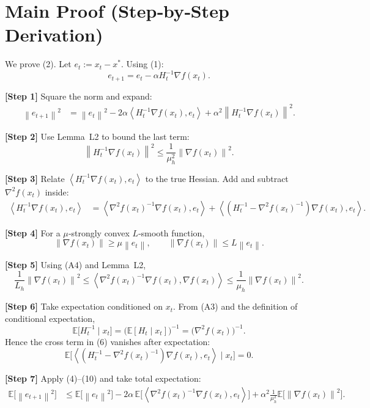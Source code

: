 \documentclass{article}
\newcommand{\E}{\mathbb{E}}
\newcommand{\norm}[1]{\left\|#1\right\|}
\newcommand{\ip}[2]{\left\langle #1,#2\right\rangle}
\begin{document}
\section*{Main Proof (Step‑by‑Step Derivation)}
We prove (2). Let $e_{t}:=x_{t}-x^{*}$. Using (1):
\[
e_{t+1}=e_{t}-\alpha H_{t}^{-1}\nabla f(x_{t}).
\tag{3}
\]

\noindent\textbf{[Step 1]} Square the norm and expand:
\[
\begin{aligned}
\norm{e_{t+1}}^{2}
&=\norm{e_{t}}^{2}
-2\alpha\ip{H_{t}^{-1}\nabla f(x_{t})}{e_{t}}
+\alpha^{2}\norm{H_{t}^{-1}\nabla f(x_{t})}^{2}.
\end{aligned}
\tag{4}
\]

\noindent\textbf{[Step 2]} Use Lemma~L2 to bound the last term:
\[
\norm{H_{t}^{-1}\nabla f(x_{t})}^{2}
\le \frac{1}{\mu_{h}^{2}}\norm{\nabla f(x_{t})}^{2}.
\tag{5}
\]

\noindent\textbf{[Step 3]} Relate $\ip{H_{t}^{-1}\nabla f(x_{t})}{e_{t}}$ to the true Hessian.
Add and subtract $\nabla^{2}f(x_{t})$ inside:
\[
\begin{aligned}
\ip{H_{t}^{-1}\nabla f(x_{t})}{e_{t}}
&=\ip{\nabla^{2}f(x_{t})^{-1}\nabla f(x_{t})}{e_{t}}
+\ip{(H_{t}^{-1}-\nabla^{2}f(x_{t})^{-1})\nabla f(x_{t})}{e_{t}}.
\end{aligned}
\tag{6}
\]

\noindent\textbf{[Step 4]} For a $\mu$‑strongly convex $L$‑smooth function,
\[
\norm{\nabla f(x_{t})}\ge\mu\norm{e_{t}},\qquad
\norm{\nabla f(x_{t})}\le L\norm{e_{t}}.
\tag{7}
\]

\noindent\textbf{[Step 5]} Using (A4) and Lemma~L2,
\[
\frac{1}{L_{h}}\norm{\nabla f(x_{t})}^{2}
\le \ip{\nabla^{2}f(x_{t})^{-1}\nabla f(x_{t})}{\nabla f(x_{t})}
\le\frac{1}{\mu_{h}}\norm{\nabla f(x_{t})}^{2}.
\tag{8}
\]

\noindent\textbf{[Step 6]} Take expectation conditioned on $x_{t}$.
From (A3) and the definition of conditional expectation,
\[
\E\!\big[H_{t}^{-1}\mid x_{t}\big]=\big(\E[H_{t}\mid x_{t}]\big)^{-1}
=\big(\nabla^{2}f(x_{t})\big)^{-1}.
\tag{9}
\]
Hence the cross term in (6) vanishes after expectation:
\[
\E\!\big[\ip{(H_{t}^{-1}-\nabla^{2}f(x_{t})^{-1})\nabla f(x_{t})}{e_{t}}\mid x_{t}\big]=0.
\tag{10}
\]

\noindent\textbf{[Step 7]} Apply (4)–(10) and take total expectation:
\[
\begin{aligned}
\E\!\big[\norm{e_{t+1}}^{2}\big]
&\le \E\!\big[\norm{e_{t}}^{2}\big]
-2\alpha\,\E\!\Big[\ip{\nabla^{2}f(x_{t})^{-1}\nabla f(x_{t})}{e_{t}}\Big]
+\alpha^{2}\frac{1}{\mu_{h}^{2}}\E\!\big[\norm{\nabla f(x_{t})}^{2}\big].
\end{aligned}
\tag{11}
\]
\end{document}
